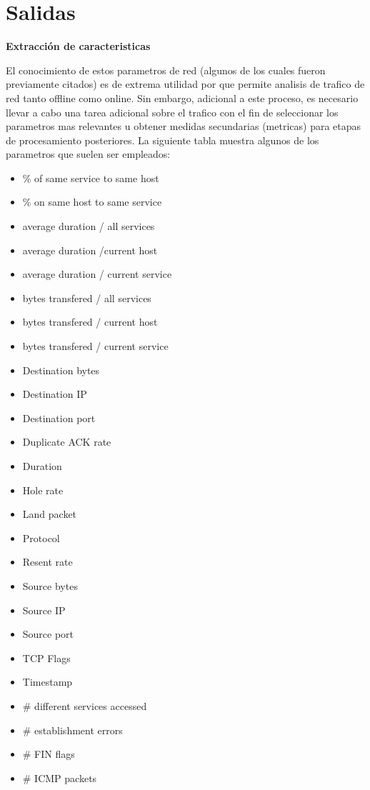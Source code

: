 \documentclass[12pt]{article}
\begin{document}
\section{Salidas}

\textbf{Extracción de caracteristicas}

El conocimiento de estos parametros de red (algunos de los cuales fueron previamente citados) es de extrema utilidad por que permite analisis de trafico de red tanto offline como online. Sin embargo, adicional a este proceso, es necesario llevar a cabo una tarea adicional sobre el trafico con el fin de seleccionar los parametros mas relevantes u obtener medidas secundarias (metricas) para etapas de procesamiento posteriores. La siguiente tabla muestra algunos de los parametros que suelen ser empleados:

\begin{itemize}
\item \% of same service to same host
\item \% on same host to same service
\item average duration / all services
\item average duration /current host
\item average duration / current service
\item bytes transfered / all services
\item bytes transfered / current host
\item bytes transfered / current service
\item Destination bytes
\item Destination IP
\item Destination port
\item Duplicate ACK rate
\item Duration
\item Hole rate
\item Land packet
\item Protocol
\item Resent rate
\item Source bytes
\item Source IP
\item Source port
\item TCP Flags
\item Timestamp
\item \# different services accessed
\item \# establishment errors
\item \# FIN flags
\item \# ICMP packets

\end{itemize}
\end{document}
